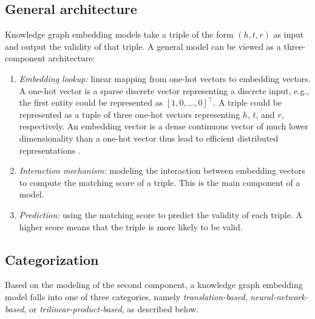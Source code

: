 \documentclass[sigconf,edbt]{acmart-edbt2019}
\begin{document}
\subsection{General architecture}
Knowledge graph embedding models take a triple of the form $ (h, t, r) $ as input and output the validity of that triple. A general model can be viewed as a three-component architecture: 
\begin{enumerate}
	\item \textit{Embedding lookup:} linear mapping from one-hot vectors to embedding vectors. A one-hot vector is a sparse discrete vector representing a discrete input, e.g., the first entity could be represented as $ [1, 0, \dots, 0]^\top $. A triple could be represented as a tuple of three one-hot vectors representing $ h $, $ t $, and $ r $, respectively. An embedding vector is a dense continuous vector of much lower dimensionality than a one-hot vector thus lead to efficient distributed representations \cite{hinton_learningdistributedrepresentations_1986} \cite{hinton_distributedrepresentations_1984}.
	\item \textit{Interaction mechanism:} modeling the interaction between embedding vectors to compute the matching score of a triple. This is the main component of a model.
	\item \textit{Prediction:} using the matching score to predict the validity of each triple. A higher score means that the triple is more likely to be valid.
\end{enumerate}

\subsection{Categorization}
Based on the modeling of the second component, a knowledge graph embedding model falls into one of three categories, namely \textit{translation-based}, \textit{neural-network-based}, or \textit{trilinear-product-based}, as described below.
\end{document}
